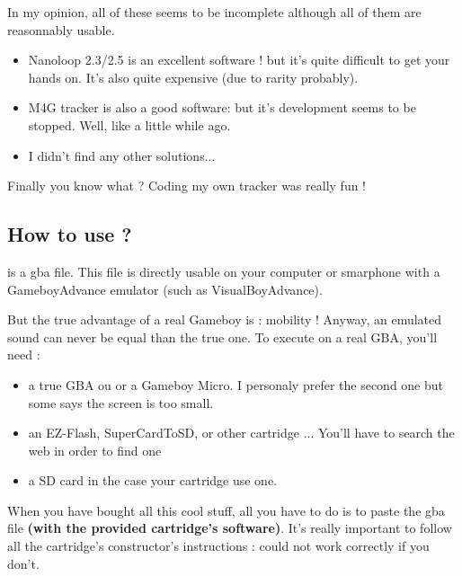 \documentclass[12pt,a4paper]{article}
\begin{document}
    In my opinion, all of these seems to be incomplete although all of them are reasonnably usable.
    \medskip

    \begin{itemize}
        \item{Nanoloop 2.3/2.5 is an excellent software ! but it's quite difficult to get your hands on. It's also quite expensive (due to rarity probably).}
        \item{M4G tracker is also a good software: but it's development seems to be stopped. Well, like \FAT a little while ago.}
        \item{I didn't find any other solutions...}
    \end{itemize}\medskip

    Finally you know what ? Coding my own tracker was really fun !
    \medskip

    \subsection{How to use \FAT ?}

    \FAT is a gba file. This file is directly usable on your computer or smarphone with a GameboyAdvance emulator (such as VisualBoyAdvance).
    \medskip

    But the true advantage of a real Gameboy is : mobility !
    Anyway, an emulated sound can never be equal than the true one.
    To execute \FAT on a real GBA, you'll need :
    \medskip

    \begin{itemize}
        \item{a true GBA ou or a Gameboy Micro. I personaly prefer the second one but some says the screen is too small.}
        \item{an EZ-Flash, SuperCardToSD, or other cartridge ... You'll have to search the web in order to find one}
        \item{a SD card in the case your cartridge use one.}
    \end{itemize}\medskip

    When you have bought all this cool stuff, all you have to do is to paste the \FAT gba file {\bf (with the provided cartridge's software)}.
    It's really important to follow all the cartridge's constructor's instructions : \FAT could not work correctly if you don't.

\end{document}
